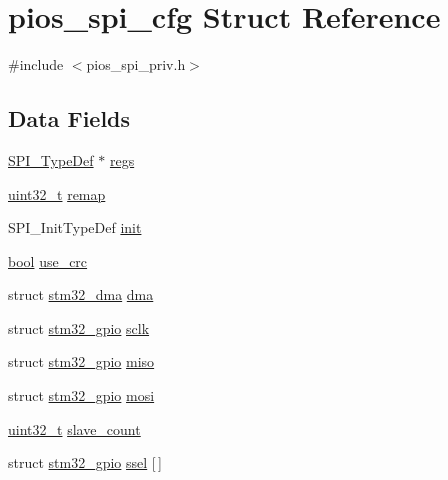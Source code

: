 \hypertarget{structpios__spi__cfg}{\section{pios\-\_\-spi\-\_\-cfg Struct Reference}
\label{structpios__spi__cfg}
}


{\ttfamily \#include $<$pios\-\_\-spi\-\_\-priv.\-h$>$}

\subsection*{Data Fields}
\begin{DoxyCompactItemize}
\item 
\hyperlink{struct_s_p_i___type_def}{S\-P\-I\-\_\-\-Type\-Def} $\ast$ \hyperlink{structpios__spi__cfg_ad167dc65625a3dd4255886c4523b5691}{regs}
\item 
\hyperlink{stdint_8h_a435d1572bf3f880d55459d9805097f62}{uint32\-\_\-t} \hyperlink{structpios__spi__cfg_a1318cbf732716210fffe77ecf7e14649}{remap}
\item 
S\-P\-I\-\_\-\-Init\-Type\-Def \hyperlink{structpios__spi__cfg_adbc1199b6671cd7ab6856b5d76038020}{init}
\item 
\hyperlink{group___exported__types_gaf6a258d8f3ee5206d682d799316314b1}{bool} \hyperlink{structpios__spi__cfg_a0ec6229d3970d89ba04dfe718bb68607}{use\-\_\-crc}
\item 
struct \hyperlink{structstm32__dma}{stm32\-\_\-dma} \hyperlink{structpios__spi__cfg_a2facc0b31de6aa6a377366b1d1dfa30f}{dma}
\item 
struct \hyperlink{structstm32__gpio}{stm32\-\_\-gpio} \hyperlink{structpios__spi__cfg_aa190920ba828502df22a5f665027b20d}{sclk}
\item 
struct \hyperlink{structstm32__gpio}{stm32\-\_\-gpio} \hyperlink{structpios__spi__cfg_ac804df72ee895e7482167ac5452b31aa}{miso}
\item 
struct \hyperlink{structstm32__gpio}{stm32\-\_\-gpio} \hyperlink{structpios__spi__cfg_adaf88353246da685e0f82e927d72eaed}{mosi}
\item 
\hyperlink{stdint_8h_a435d1572bf3f880d55459d9805097f62}{uint32\-\_\-t} \hyperlink{structpios__spi__cfg_ad45aed059de6082ab6c257da0018d867}{slave\-\_\-count}
\item 
struct \hyperlink{structstm32__gpio}{stm32\-\_\-gpio} \hyperlink{structpios__spi__cfg_ac1c73f49ee01a82a50dff4f2eb0fbb8e}{ssel} \mbox{[}$\,$\mbox{]}
\end{DoxyCompactItemize}


